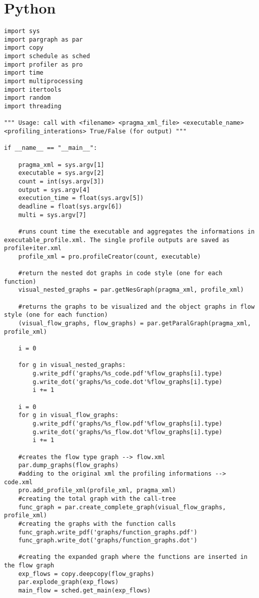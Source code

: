 \documentclass[a4paper,11pt,twoside]{book}
\begin{document}
\chapter{Python}

\begin{lstlisting}[language=CCC, caption=graphCreator.py]
import sys
import pargraph as par
import copy
import schedule as sched
import profiler as pro
import time
import multiprocessing
import itertools
import random
import threading

""" Usage: call with <filename> <pragma_xml_file> <executable_name> <profiling_interations> True/False (for output) """

if __name__ == "__main__":

	pragma_xml = sys.argv[1]
	executable = sys.argv[2]
	count = int(sys.argv[3])
	output = sys.argv[4]
	execution_time = float(sys.argv[5])
	deadline = float(sys.argv[6])
	multi = sys.argv[7]

	#runs count time the executable and aggregates the informations in executable_profile.xml. The single profile outputs are saved as profile+iter.xml
	profile_xml = pro.profileCreator(count, executable)

	#return the nested dot graphs in code style (one for each function)
	visual_nested_graphs = par.getNesGraph(pragma_xml, profile_xml)

	#returns the graphs to be visualized and the object graphs in flow style (one for each function)
	(visual_flow_graphs, flow_graphs) = par.getParalGraph(pragma_xml, profile_xml) 

	i = 0

	for g in visual_nested_graphs:
		g.write_pdf('graphs/%s_code.pdf'%flow_graphs[i].type)
		g.write_dot('graphs/%s_code.dot'%flow_graphs[i].type)
		i += 1

	i = 0
	for g in visual_flow_graphs:
		g.write_pdf('graphs/%s_flow.pdf'%flow_graphs[i].type)
		g.write_dot('graphs/%s_flow.dot'%flow_graphs[i].type)
		i += 1

	#creates the flow type graph --> flow.xml
	par.dump_graphs(flow_graphs)
	#adding to the original xml the profiling informations --> code.xml
	pro.add_profile_xml(profile_xml, pragma_xml)
	#creating the total graph with the call-tree
	func_graph = par.create_complete_graph(visual_flow_graphs, profile_xml)
	#creating the graphs with the function calls
	func_graph.write_pdf('graphs/function_graphs.pdf')
	func_graph.write_dot('graphs/function_graphs.dot')

	#creating the expanded graph where the functions are inserted in the flow graph
	exp_flows = copy.deepcopy(flow_graphs)
	par.explode_graph(exp_flows)
	main_flow = sched.get_main(exp_flows)


\end{lstlisting}
\end{document}
